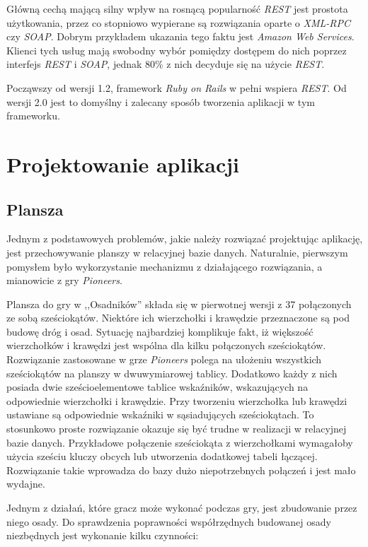 \documentclass[a4paper,12pt]{article}
\begin{document}
Główną cechą mającą silny wpływ na rosnącą popularność \emph{REST}
jest prostota użytkowania, przez co stopniowo wypierane są rozwiązania
oparte o \emph{XML-RPC} czy \emph{SOAP}. Dobrym przykładem ukazania
tego faktu jest \emph{Amazon Web Services}. Klienci tych usług mają
swobodny wybór pomiędzy dostępem do nich poprzez interfejs \emph{REST}
i \emph{SOAP}, jednak 80\% z nich decyduje się na użycie
\emph{REST}\cite{awsblog}.

Począwszy od wersji 1.2, framework \emph{Ruby on Rails} w pełni
wspiera \emph{REST}. Od wersji 2.0 jest to domyślny i zalecany sposób
tworzenia aplikacji w tym frameworku.

\clearpage

\section{Projektowanie aplikacji}

\subsection{Plansza}\label{sec:board}
Jednym z podstawowych problemów, jakie należy rozwiązać projektując
aplikację, jest przechowywanie planszy w relacyjnej bazie
danych. Naturalnie, pierwszym pomysłem było wykorzystanie mechanizmu z
działającego rozwiązania, a mianowicie z gry \emph{Pioneers}.

Plansza do gry w ,,Osadników'' składa się w pierwotnej wersji z 37
połączonych ze sobą sześciokątów. Niektóre ich wierzchołki i krawędzie
przeznaczone są pod budowę dróg i osad. Sytuację najbardziej
komplikuje fakt, iż większość wierzchołków i krawędzi jest wspólna dla
kilku połączonych sześciokątów. Rozwiązanie zastosowane w grze
\emph{Pioneers} polega na ułożeniu wszystkich sześciokątów na planszy
w dwuwymiarowej tablicy. Dodatkowo każdy z nich posiada dwie
sześcioelementowe tablice wskaźników, wskazujących na odpowiednie
wierzchołki i krawędzie. Przy tworzeniu wierzchołka lub krawędzi
ustawiane są odpowiednie wskaźniki w sąsiadujących sześciokątach. To
stosunkowo proste rozwiązanie okazuje się być trudne w realizacji w
relacyjnej bazie danych. Przykładowe połączenie sześciokąta z
wierzchołkami wymagałoby użycia sześciu kluczy obcych lub utworzenia
dodatkowej tabeli łączącej. Rozwiązanie takie wprowadza do bazy dużo
niepotrzebnych połączeń i jest mało wydajne.

Jednym z działań, które gracz może wykonać podczas gry, jest
zbudowanie przez niego osady. Do sprawdzenia poprawności współrzędnych
budowanej osady niezbędnych jest wykonanie kilku czynności:
\end{document}
